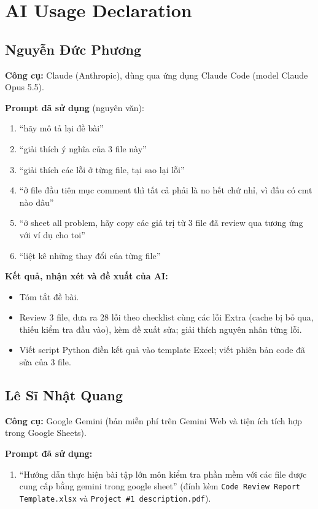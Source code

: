 \documentclass[12pt,a4paper]{article}
\begin{document}
\section{AI Usage Declaration}

\subsection{Nguyễn Đức Phương}
\textbf{Công cụ:} Claude (Anthropic), dùng qua ứng dụng Claude Code (model Claude Opus 5.5).

\noindent\textbf{Prompt đã sử dụng} (nguyên văn):
\begin{enumerate}[noitemsep]
  \item ``hãy mô tả lại đề bài''
  \item ``giải thích ý nghĩa của 3 file này''
  \item ``giải thích các lỗi ở từng file, tại sao lại lỗi''
  \item ``ở file đầu tiên mục comment thì tất cả phải là no hết chứ nhỉ, vì đấu có cmt nào đâu''
  \item ``ở sheet all problem, hãy copy các giá trị từ 3 file đã review qua tương ứng với ví dụ cho toi''
  \item ``liệt kê những thay đổi của từng file''
\end{enumerate}

\noindent\textbf{Kết quả, nhận xét và đề xuất của AI:}
\begin{itemize}[noitemsep]
  \item Tóm tắt đề bài.
  \item Review 3 file, đưa ra 28 lỗi theo checklist cùng các lỗi Extra (cache bị bỏ qua, thiếu kiểm tra đầu vào), kèm đề xuất sửa; giải thích nguyên nhân từng lỗi.
  \item Viết script Python điền kết quả vào template Excel; viết phiên bản code đã sửa của 3 file.
\end{itemize}

\subsection{Lê Sĩ Nhật Quang}
\textbf{Công cụ:} Google Gemini (bản miễn phí trên Gemini Web và tiện ích tích hợp trong Google Sheets).

\noindent\textbf{Prompt đã sử dụng:}
\begin{enumerate}[noitemsep]
  \item ``Hướng dẫn thực hiện bài tập lớn môn kiểm tra phần mềm với các file được cung cấp bằng gemini trong google sheet'' (đính kèm \texttt{Code Review Report Template.xlsx} và \texttt{Project \#1 description.pdf}).
\end{enumerate}
\end{document}
